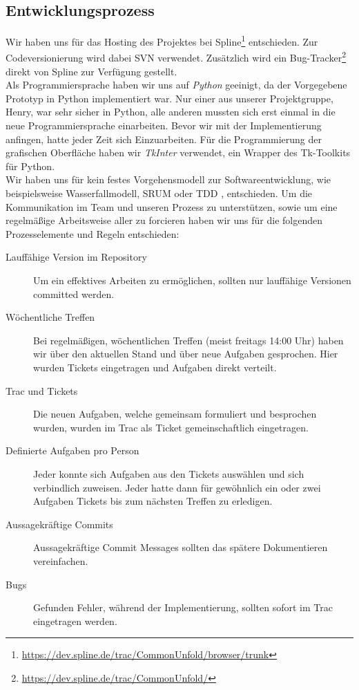 \subsection{Entwicklungsprozess}
\label{subsec:prozess}

Wir haben uns für das Hosting des Projektes bei Spline\footnote{\url{https://dev.spline.de/trac/CommonUnfold/browser/trunk}} entschieden. Zur Codeversionierung wird dabei SVN verwendet. Zusätzlich wird ein Bug-Tracker\footnote{\url{https://dev.spline.de/trac/CommonUnfold/}} direkt von Spline zur Verfügung gestellt.\\

Als Programmiersprache haben wir uns auf \emph{Python} geeinigt, da der Vorgegebene Prototyp in Python implementiert war. Nur einer aus unserer Projektgruppe, Henry, war sehr sicher in Python, alle anderen mussten sich erst einmal in die neue Programmiersprache einarbeiten. Bevor wir mit der Implementierung anfingen, hatte jeder Zeit sich Einzuarbeiten. Für die Programmierung der grafischen Oberfläche haben wir \emph{TkInter} verwendet, ein Wrapper des Tk-Toolkits für Python.\\

Wir haben uns für kein festes Vorgehensmodell zur Softwareentwicklung, wie beispielsweise Wasserfallmodell, SRUM oder TDD , entschieden. Um die Kommunikation im Team und unseren Prozess zu unterstützen, sowie um eine regelmäßige Arbeitsweise aller zu forcieren haben wir uns für die folgenden Prozesselemente und Regeln entschieden:

  \begin{description}
    \item[Lauffähige Version im Repository] Um ein effektives Arbeiten zu ermöglichen, sollten nur lauffähige Versionen committed werden.
    \item[Wöchentliche Treffen] Bei regelmäßigen, wöchentlichen Treffen (meist freitags 14:00 Uhr) haben wir über den aktuellen Stand und über neue Aufgaben gesprochen. Hier wurden Tickets eingetragen und Aufgaben direkt verteilt.
    \item[Trac und Tickets] Die neuen Aufgaben, welche gemeinsam formuliert und besprochen wurden, wurden im Trac als Ticket gemeinschaftlich eingetragen.
    \item[Definierte Aufgaben pro Person] Jeder konnte sich Aufgaben aus den Tickets auswählen und sich verbindlich zuweisen. Jeder hatte dann für gewöhnlich ein oder zwei Aufgaben \bzw Tickets bis zum nächsten Treffen zu erledigen.
    \item[Aussagekräftige Commits] Aussagekräftige Commit Messages sollten das spätere Dokumentieren vereinfachen.
    \item[Bugs] Gefunden Fehler, während der Implementierung, sollten sofort im Trac eingetragen werden. 
  \end{description}

